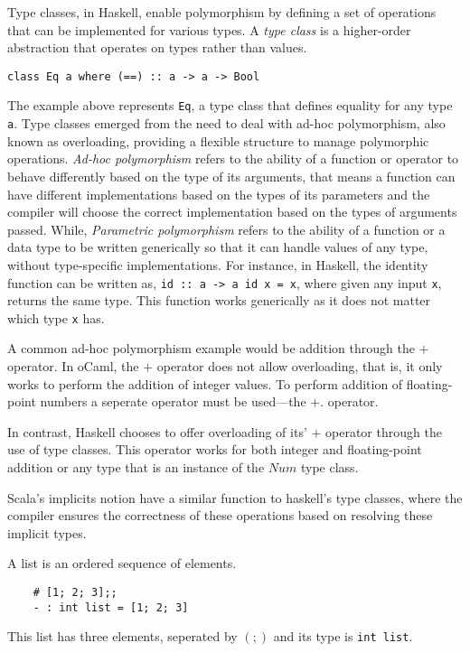 Type classes, in Haskell, enable polymorphism by defining a set of operations that can be implemented for various types. A \textit{type class} is a higher-order abstraction that operates on types rather than values.

\lstinline{class Eq a where (==) :: a -> a -> Bool}

The example above represents \lstinline{Eq}, a type class that defines equality for any type \lstinline{a}. Type classes emerged from the need to deal with ad-hoc polymorphism, also known as overloading, providing a flexible structure to manage polymorphic operations. 
\textit{Ad-hoc polymorphism} refers to the ability of a function or operator to behave differently based on the type of its arguments, that means a function can have different implementations based on the types of its parameters and the compiler will choose the correct implementation based on the types of arguments passed.
While, \textit{Parametric polymorphism} refers to the ability of a function or a data type to be written generically so that it can handle values of any type, without type-specific implementations. For instance, in Haskell, the identity function can be written as, \lstinline{id :: a -> a id x = x}, where given any input \lstinline{x}, returns the same type. This function works generically as it does not matter which type \lstinline{x} has.


A common ad-hoc polymorphism example would be addition through the $+$ operator. In oCaml, the $+$ operator does not allow overloading, that is, it only works to perform the addition of integer values. To perform addition of floating-point numbers a seperate operator must be used---the $+.$ operator.

In contrast, Haskell chooses to offer overloading of its' $+$ operator through the use of type classes. This operator works for both integer and floating-point addition or any type that is an instance of the $Num$ type class.

Scala’s implicits notion have a similar function to haskell's type classes, where the compiler ensures the correctness of these operations based on resolving these implicit types. %


A list is an ordered sequence of elements. 
\begin{lstlisting}
    # [1; 2; 3];;
    - : int list = [1; 2; 3]
\end{lstlisting}
This list has three elements, seperated by $(;)$ and its type is \lstinline{int list}.

